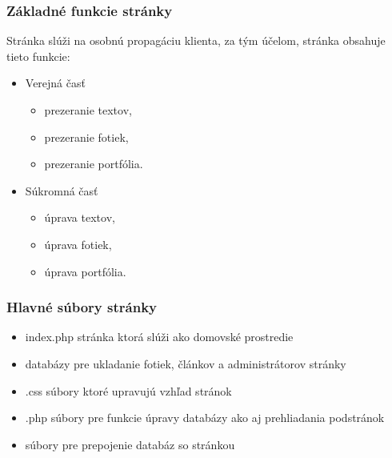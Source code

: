 
\label{Základné funkcie stránky}
\begin{frame}\frametitle{Základné funkcie stránky}

Stránka slúži na osobnú propagáciu klienta, za tým účelom, stránka obsahuje tieto funkcie:

  \begin{itemize}

        \item Verejná časť

           \begin{itemize}
                \item prezeranie textov,
                \item prezeranie fotiek,
                \item prezeranie portfólia.
            \end{itemize}
         \item Súkromná časť

         \begin{itemize}
            \item úprava textov,
             \item úprava fotiek,
             \item úprava portfólia.
       \end{itemize}
  \end{itemize}
\end{frame}


\begin{frame}\frametitle{Hlavné súbory stránky}
  
    \begin{itemize}

         \item index.php stránka ktorá slúži ako domovské prostredie
         \item databázy pre ukladanie fotiek, článkov a administrátorov stránky
         \item .css súbory ktoré upravujú vzhľad stránok
         \item .php súbory pre funkcie úpravy databázy ako aj prehliadania podstránok
         \item súbory pre prepojenie databáz so stránkou
  \end{itemize}
\end{frame}



